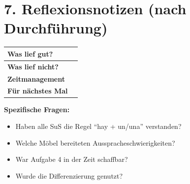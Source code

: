 \documentclass[11pt, a4paper]{article}
\begin{document}
\section*{7. Reflexionsnotizen (nach Durchführung)}

\begin{tabularx}{\textwidth}{|l|X|}
\hline
\textbf{Was lief gut?} & \\[2em]
\hline
\textbf{Was lief nicht?} & \\[2em]
\hline
\textbf{Zeitmanagement} & \\[2em]
\hline
\textbf{Für nächstes Mal} & \\[2em]
\hline
\end{tabularx}

\vspace{1em}

\textbf{Spezifische Fragen:}
\begin{itemize}
    \item Haben alle SuS die Regel ``hay + un/una'' verstanden?
    \item Welche Möbel bereiteten Ausspracheschwierigkeiten?
    \item War Aufgabe 4 in der Zeit schaffbar?
    \item Wurde die Differenzierung genutzt?
\end{itemize}
\end{document}
